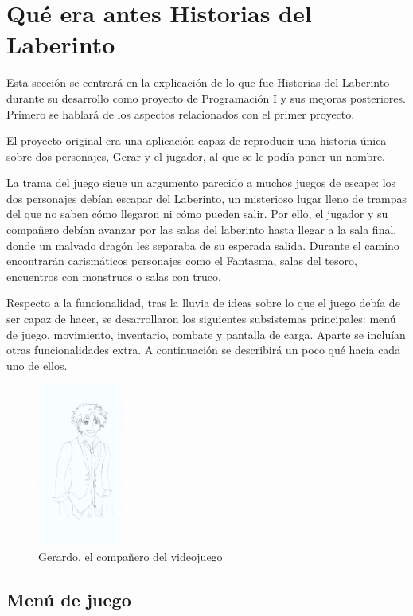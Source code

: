 \newpage
\section{Qué era antes Historias del Laberinto}

Esta sección se centrará en la explicación de lo que fue Historias del Laberinto durante su desarrollo como proyecto de Programación I y sus mejoras posteriores.
Primero se hablará de los aspectos relacionados con el primer proyecto.

El proyecto original era una aplicación capaz de reproducir una historia única sobre dos personajes, Gerar y el jugador, al que se le podía poner un nombre.

La trama del juego sigue un argumento parecido a muchos juegos de escape: los dos personajes debían escapar del Laberinto, un misterioso lugar lleno de trampas del que no saben cómo llegaron ni cómo pueden salir. Por ello, el jugador y su compañero debían avanzar por las salas del laberinto hasta llegar a la sala final, donde un malvado dragón les separaba de su esperada salida. Durante el camino encontrarán carismáticos personajes como el Fantasma, salas del tesoro, encuentros con monstruos o salas con truco.

Respecto a la funcionalidad, tras la lluvia de ideas sobre lo que el juego debía de ser capaz de hacer, se desarrollaron los siguientes subsistemas principales: menú de juego, movimiento, inventario, combate y pantalla de carga. Aparte se incluían otras funcionalidades extra.
A continuación se describirá un poco qué hacía cada uno de ellos.

\begin{figure}[h]
	\caption{Gerardo, el compañero del videojuego}
	\centering
	\includegraphics[width=0.25\textwidth]{include/GerardoPres.png}
\end{figure}

\subsection{Menú de juego}

